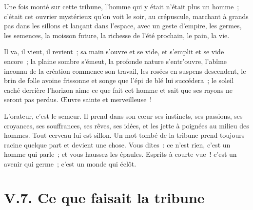 \documentclass[french,twoside]{book} %
\begin{document}
\noindent Une fois monté sur cette tribune, l’homme qui y était n’était plus un homme ; c’était cet ouvrier mystérieux qu’on voit le soir, au crépuscule, marchant à grands pas dans les sillons et lançant dans l’espace, avec un geste d’empire, les germes, les semences, la moisson future, la richesse de l’été prochain, le pain, la vie.\par
Il va, il vient, il revient ; sa main s’ouvre et se vide, et s’emplit et se vide encore ; la plaine sombre s’émeut, la profonde nature s’entr’ouvre, l’abîme inconnu de la création commence son travail, les rosées en suspens descendent, le brin de folle avoine frissonne et songe que l’épi de blé lui succédera ; le soleil caché derrière l’horizon aime ce que fait cet homme et sait que ses rayons ne seront pas perdus. Œuvre sainte et merveilleuse !\par
L’orateur, c’est le semeur. Il prend dans son cœur ses instincts, ses passions, ses croyances, ses souffrances, ses rêves, ses idées, et les jette à poignées au milieu des hommes. Tout cerveau lui est sillon. Un mot tombé de la tribune prend toujours racine quelque part et devient une chose. Vous dites : ce n’est rien, c’est un homme qui parle ; et vous haussez les épaules. Esprits à courte vue ! c’est un avenir qui germe ; c’est un monde qui éclôt.

\section[{V.7. Ce que faisait la tribune}]{V.7. Ce que faisait la tribune}
\end{document}

